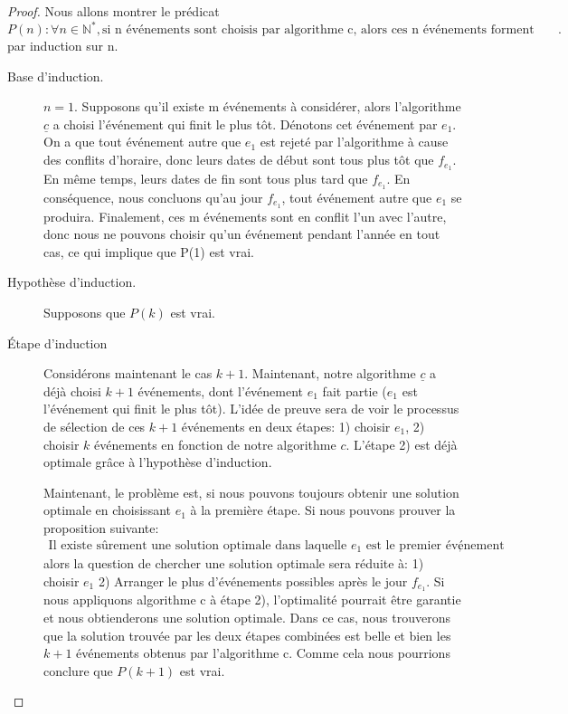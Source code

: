 \documentclass[10pt,a4paper]{article}
\begin{document}
\begin{proof}
	Nous allons montrer le prédicat 
	\[
	P(n): \forall n \in \mathbb{N}^{*}, \text{si n événements sont choisis par algorithme c, alors ces n événements forment une solution optimale}
	.\] 	
	par induction sur n. 
	\begin{description}
		\item[Base d'induction.] $n = 1$. Supposons qu'il existe m événements à considérer, alors l'algorithme $\underline{c}$ a choisi l'événement qui finit le plus tôt. Dénotons cet événement par $e_1$. On a que tout événement autre que $e_1$ est rejeté par l'algorithme à cause des conflits d'horaire, donc leurs dates de début sont tous plus tôt que $f_{e_1}$. En même temps, leurs dates de fin sont tous plus tard que $f_{e_1}$. En conséquence, nous concluons qu'au jour $f_{e_1}$, tout événement autre que $e_1$ se produira. Finalement, ces m événements sont en conflit l'un avec l'autre, donc nous ne pouvons choisir qu'un événement pendant l'année en tout cas, ce qui implique que P(1) est vrai. 
		\item[Hypothèse d'induction.] Supposons que $P(k)$ est vrai.
		\item[Étape d'induction] Considérons maintenant le cas $k+1$. Maintenant, notre algorithme $\underline{c}$ a déjà choisi $k+1$ événements, dont l'événement $e_1$ fait partie ($e_1$ est l'événement qui finit le plus tôt). L'idée de preuve sera de voir le processus de sélection de ces  $k+1$ événements en deux étapes: 1) choisir $e_1$, 2) choisir $k$ événements en fonction de notre algorithme $c$. L'étape 2) est déjà optimale grâce à l'hypothèse d'induction. 
		\newline	

		Maintenant, le problème est, si nous pouvons toujours obtenir une solution optimale en choisissant $e_1$ à la première étape. Si nous pouvons prouver la proposition suivante: 
		\begin{align}
			\text{Il existe sûrement une solution optimale dans laquelle $e_1$ est le premier événement}, \label{proposition1}
		\end{align} 
		alors la question de chercher une solution optimale sera réduite à: 1) choisir $e_1$ 2) Arranger le plus d'événements possibles après le jour $f_{e_1}$. Si nous appliquons algorithme c à étape 2), l'optimalité pourrait être garantie et nous obtienderons une solution optimale. Dans ce cas, nous trouverons que la solution trouvée par les deux étapes combinées est belle et bien les $k+1$ événements obtenus par l'algorithme c. Comme cela nous pourrions conclure que $P(k+1)$ est vrai.
\newline


\end{description}
\end{proof}
\end{document}
